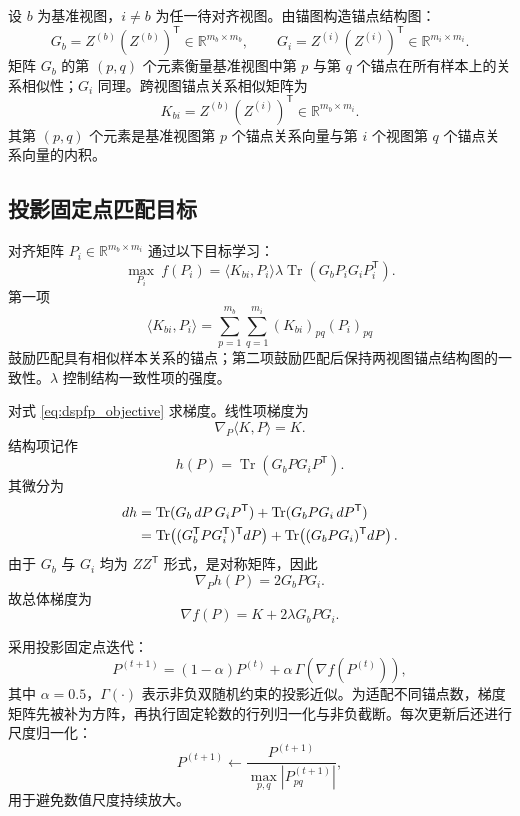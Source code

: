 \documentclass[UTF8,a4paper,12pt,fontset=none]{ctexart}
\newcommand{\R}{\mathbb{R}}
\newcommand{\tr}{\operatorname{Tr}}
\newcommand{\T}{\mathsf{T}}
\begin{document}
设 \(b\) 为基准视图，\(i\ne b\) 为任一待对齐视图。由锚图构造锚点结构图：
\begin{equation}
G_b=Z^{(b)}(Z^{(b)})^\T\in\R^{m_b\times m_b},
\qquad
G_i=Z^{(i)}(Z^{(i)})^\T\in\R^{m_i\times m_i}.
\end{equation}
矩阵 \(G_b\) 的第 \((p,q)\) 个元素衡量基准视图中第 \(p\) 与第 \(q\) 个锚点在所有样本上的关系相似性；\(G_i\) 同理。跨视图锚点关系相似矩阵为
\begin{equation}
K_{bi}=Z^{(b)}(Z^{(i)})^\T\in\R^{m_b\times m_i}.
\end{equation}
其第 \((p,q)\) 个元素是基准视图第 \(p\) 个锚点关系向量与第 \(i\) 个视图第 \(q\) 个锚点关系向量的内积。

\subsection{投影固定点匹配目标}

对齐矩阵 \(P_i\in\R^{m_b\times m_i}\) 通过以下目标学习：
\begin{equation}
\max_{P_i}
\ f(P_i)
=
\langle K_{bi},P_i\rangle
\lambda\tr(G_bP_iG_iP_i^\T).
\label{eq:dspfp_objective}
\end{equation}
第一项
\begin{equation}
\langle K_{bi},P_i\rangle
=\sum_{p=1}^{m_b}\sum_{q=1}^{m_i}
(K_{bi})_{pq}(P_i)_{pq}
\end{equation}
鼓励匹配具有相似样本关系的锚点；第二项鼓励匹配后保持两视图锚点结构图的一致性。\(\lambda\) 控制结构一致性项的强度。

对式 \eqref{eq:dspfp_objective} 求梯度。线性项梯度为
\begin{equation}
\nabla_P\langle K,P\rangle=K.
\end{equation}
结构项记作
\[
h(P)=\tr(G_bPG_iP^\T).
\]
其微分为
\begin{align}
dh
&=
\tr(G_b\,dP\,G_iP^\T)
+\tr(G_bPG_i\,dP^\T) \notag\\
&=
\tr\!\left((G_b^\T P G_i^\T)^\T dP\right)
+\tr\!\left((G_bPG_i)^\T dP\right).
\end{align}
由于 \(G_b\) 与 \(G_i\) 均为 \(ZZ^\T\) 形式，是对称矩阵，因此
\begin{equation}
\nabla_P h(P)=2G_bPG_i .
\end{equation}
故总体梯度为
\begin{equation}
\nabla f(P)=K+2\lambda G_bPG_i .
\label{eq:p_gradient}
\end{equation}

采用投影固定点迭代：
\begin{equation}
P^{(t+1)}
=(1-\alpha)P^{(t)}
+\alpha\,\Gamma\!\left(\nabla f(P^{(t)})\right),
\label{eq:pfp_update}
\end{equation}
其中 \(\alpha=0.5\)，\(\Gamma(\cdot)\) 表示非负双随机约束的投影近似。为适配不同锚点数，梯度矩阵先被补为方阵，再执行固定轮数的行列归一化与非负截断。每次更新后还进行尺度归一化：
\begin{equation}
P^{(t+1)}
\leftarrow
\frac{P^{(t+1)}}{\max_{p,q}|P_{pq}^{(t+1)}|},
\end{equation}
用于避免数值尺度持续放大。
\end{document}
